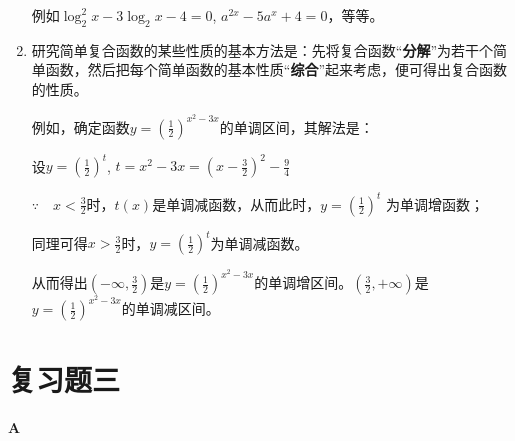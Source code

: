 \begin{enumerate}
例如$\log_2^2 x-3\log_2x-4=0$, $a^{2x}-5a^x+4=0$，等等。
\item  研究简单复合函数的某些性质的基本方法是：先将复合函数“\textbf{分解}”为若干个简单函数，然后把每个简单函数的基本性质“\textbf{综合}”起来考虑，便可得出复合函数的性质。

例如，确定函数$y=\left(\frac{1}{2}\right)^{x^2-3x}$的单调区间，其解法是：

设$y=\left(\frac{1}{2}\right)^t$, $t=x^2-3x=\left(x-\frac{3}{2}\right)^2-\frac{9}{4}$

$\because\quad x<\frac{3}{2}$时，$t(x)$是单调减函数，从而此时，$y=\left(\frac{1}{2}\right)^t$
为单调增函数；

同理可得$x>\frac{3}{2}$时，$y=\left(\frac{1}{2}\right)^t$为单调减函数。

从而得出$\left(-\infty, \frac{3}{2}\right)$是$y=\left(\frac{1}{2}\right)^{x^2-3x}$的单调增区间。$\left(\frac{3}{2},+\infty\right)$是$y=\left(\frac{1}{2}\right)^{x^2-3x}$的单调减区间。
\end{enumerate}

\section*{复习题三}
\begin{center}
\bfseries A    
\end{center}

